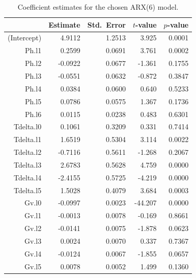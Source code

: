 \begin{table}[ht]
\centering
\caption{Coefficient estimates for the chosen ARX(6) model.} 
\label{tab:arx6_coef}
\begin{tabular}{rrrrr}
  \toprule
 & Estimate & Std.\ Error & $t$-value & $p$-value \\ 
  \midrule
(Intercept) & 4.9112 & 1.2513 & 3.925 & 0.0001 \\ 
  Ph.l1 & 0.2599 & 0.0691 & 3.761 & 0.0002 \\ 
  Ph.l2 & -0.0922 & 0.0677 & -1.361 & 0.1755 \\ 
  Ph.l3 & -0.0551 & 0.0632 & -0.872 & 0.3847 \\ 
  Ph.l4 & 0.0384 & 0.0600 & 0.640 & 0.5233 \\ 
  Ph.l5 & 0.0786 & 0.0575 & 1.367 & 0.1736 \\ 
  Ph.l6 & 0.0115 & 0.0238 & 0.483 & 0.6301 \\ 
  Tdelta.l0 & 0.1061 & 0.3209 & 0.331 & 0.7414 \\ 
  Tdelta.l1 & 1.6519 & 0.5304 & 3.114 & 0.0022 \\ 
  Tdelta.l2 & -0.7116 & 0.5611 & -1.268 & 0.2067 \\ 
  Tdelta.l3 & 2.6783 & 0.5628 & 4.759 & 0.0000 \\ 
  Tdelta.l4 & -2.4155 & 0.5725 & -4.219 & 0.0000 \\ 
  Tdelta.l5 & 1.5028 & 0.4079 & 3.684 & 0.0003 \\ 
  Gv.l0 & -0.0997 & 0.0023 & -44.207 & 0.0000 \\ 
  Gv.l1 & -0.0013 & 0.0078 & -0.169 & 0.8661 \\ 
  Gv.l2 & -0.0141 & 0.0075 & -1.878 & 0.0623 \\ 
  Gv.l3 & 0.0024 & 0.0070 & 0.337 & 0.7367 \\ 
  Gv.l4 & -0.0124 & 0.0067 & -1.855 & 0.0657 \\ 
  Gv.l5 & 0.0078 & 0.0052 & 1.499 & 0.1360 \\ 
   \bottomrule
\end{tabular}
\end{table}
